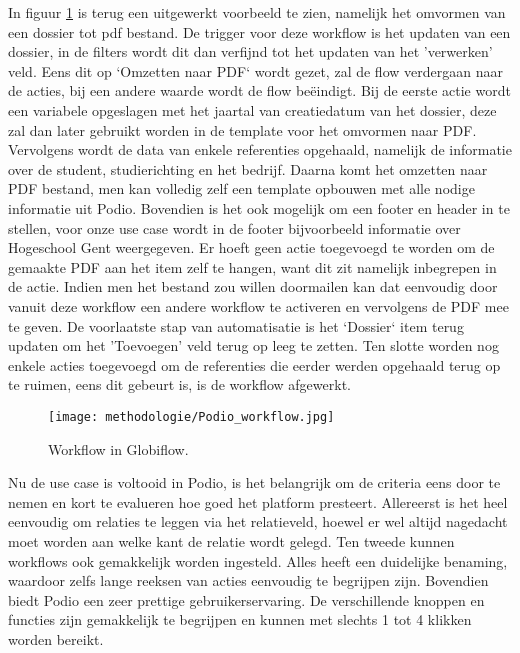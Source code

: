 In figuur \ref{fig:meth_podio_workflow} is terug een uitgewerkt voorbeeld te zien, namelijk het omvormen van een dossier tot pdf bestand. De trigger voor deze workflow is het updaten van een dossier, in de filters wordt dit dan verfijnd tot het updaten van het 'verwerken' veld. Eens dit op `Omzetten naar PDF` wordt gezet, zal de flow verdergaan naar de acties, bij een andere waarde wordt de flow beëindigt. Bij de eerste actie wordt een variabele opgeslagen met het jaartal van creatiedatum van het dossier, deze zal dan later gebruikt worden in de template voor het omvormen naar PDF. Vervolgens wordt de data van enkele referenties opgehaald, namelijk de informatie over de student, studierichting en het bedrijf. Daarna komt het omzetten naar PDF bestand, men kan volledig zelf een template opbouwen met alle nodige informatie uit Podio. Bovendien is het ook mogelijk om een footer en header in te stellen, voor onze use case wordt in de footer bijvoorbeeld informatie over Hogeschool Gent weergegeven. Er hoeft geen actie toegevoegd te worden om de gemaakte PDF aan het item zelf te hangen, want dit zit namelijk inbegrepen in de actie. Indien men het bestand zou willen doormailen kan dat eenvoudig door vanuit deze workflow een andere workflow te activeren en vervolgens de PDF mee te geven. De voorlaatste stap van automatisatie is het `Dossier` item terug updaten om het 'Toevoegen' veld terug op leeg te zetten. Ten slotte worden nog enkele acties toegevoegd om de referenties die eerder werden opgehaald terug op te ruimen, eens dit gebeurt is, is de workflow afgewerkt. \\

\begin{figure}[ht]
    \centering
    \texttt{[image: methodologie/Podio\_workflow.jpg]}
    \caption{Workflow in Globiflow.}
    \label{fig:meth_podio_workflow}
\end{figure}

Nu de use case is voltooid in Podio, is het belangrijk om de criteria eens door te nemen en kort te evalueren hoe goed het platform presteert. Allereerst is het heel eenvoudig om relaties te leggen via het relatieveld, hoewel er wel altijd nagedacht moet worden aan welke kant de relatie wordt gelegd. Ten tweede kunnen workflows ook gemakkelijk worden ingesteld. Alles heeft een duidelijke benaming, waardoor zelfs lange reeksen van acties eenvoudig te begrijpen zijn. Bovendien biedt Podio een zeer prettige gebruikerservaring. De verschillende knoppen en functies zijn gemakkelijk te begrijpen en kunnen met slechts 1 tot 4 klikken worden bereikt. \\

